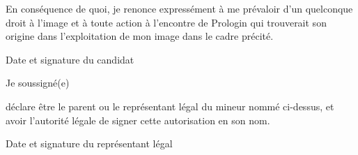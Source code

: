 \documentclass[a4paper,12pt]{prologin}
\begin{document}
En conséquence de quoi, je renonce expressément à me prévaloir d'un
quelconque droit à l'image et à toute action à l'encontre de Prologin qui
trouverait son origine dans l'exploitation de mon image dans le cadre précité.

\begin{signatureframe}{Date et signature du candidat}\end{signatureframe}

\begin{legalrepframe}[title=À remplir par le représentant légal si le candidat est mineur]
Je soussigné(e) \hrulefill

déclare être le parent ou le représentant légal du mineur nommé
ci-dessus, et avoir l'autorité légale de signer cette autorisation en son nom.

\begin{signatureframe}{Date et signature du représentant légal}\end{signatureframe}
\end{legalrepframe}
\end{document}
